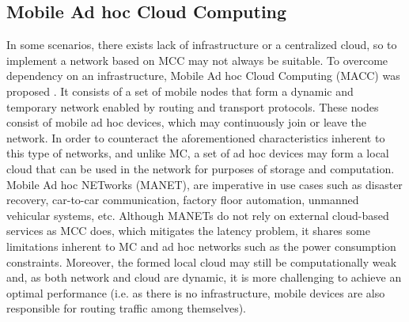 \subsection{Mobile Ad hoc Cloud Computing}
In some scenarios, there exists lack of infrastructure or a centralized cloud, so to implement a network based on MCC may not always be suitable. To overcome dependency on an infrastructure, Mobile Ad hoc Cloud Computing (MACC) was proposed \cite{hubaux2001toward}. It consists of a set of mobile nodes that form a dynamic and temporary network enabled by routing and transport protocols. These nodes consist of mobile ad hoc devices, which may continuously join or leave the network. In order to counteract the aforementioned characteristics inherent to this type of networks, and unlike MC, a set of ad hoc devices may form a local cloud that can be used in the network for purposes of storage and computation. Mobile Ad hoc NETworks (MANET), are imperative in use cases such as disaster recovery, car-to-car communication, factory floor automation, unmanned vehicular systems, etc. Although MANETs do not rely on external cloud-based services as MCC does, which mitigates the latency problem, it shares some limitations inherent to MC and ad hoc networks such as the power consumption constraints. Moreover, the formed local cloud may still be computationally weak and, as both network and cloud are dynamic, it is more challenging to achieve an optimal performance (i.e. as there is no infrastructure, mobile devices are also responsible for routing traffic among themselves).

